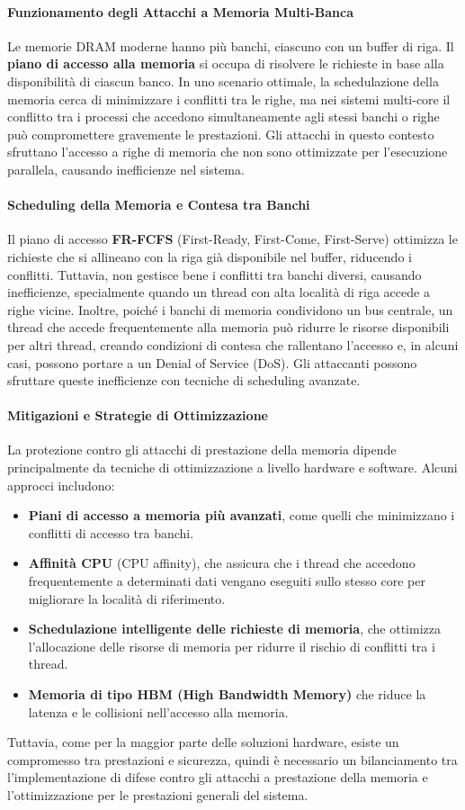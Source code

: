 \paragraph{Funzionamento degli Attacchi a Memoria Multi-Banca}
Le memorie DRAM moderne hanno più banchi, ciascuno con un buffer di riga. Il \textbf{piano di accesso alla memoria} si occupa di risolvere le richieste in base alla disponibilità di ciascun banco. In uno scenario ottimale, la schedulazione della memoria cerca di minimizzare i conflitti tra le righe, ma nei sistemi multi-core il conflitto tra i processi che accedono simultaneamente agli stessi banchi o righe può compromettere gravemente le prestazioni. Gli attacchi in questo contesto sfruttano l'accesso a righe di memoria che non sono ottimizzate per l'esecuzione parallela, causando inefficienze nel sistema.

\paragraph{Scheduling della Memoria e Contesa tra Banchi}
Il piano di accesso \textbf{FR-FCFS} (First-Ready, First-Come, First-Serve) ottimizza le richieste che si allineano con la riga già disponibile nel buffer, riducendo i conflitti. Tuttavia, non gestisce bene i conflitti tra banchi diversi, causando inefficienze, specialmente quando un thread con alta località di riga accede a righe vicine. Inoltre, poiché i banchi di memoria condividono un bus centrale, un thread che accede frequentemente alla memoria può ridurre le risorse disponibili per altri thread, creando condizioni di contesa che rallentano l'accesso e, in alcuni casi, possono portare a un Denial of Service (DoS). Gli attaccanti possono sfruttare queste inefficienze con tecniche di scheduling avanzate.

\paragraph{Mitigazioni e Strategie di Ottimizzazione}
La protezione contro gli attacchi di prestazione della memoria dipende principalmente da tecniche di ottimizzazione a livello hardware e software. Alcuni approcci includono:

\begin{itemize}
  \item \textbf{Piani di accesso a memoria più avanzati}, come quelli che minimizzano i conflitti di accesso tra banchi.
  \item \textbf{Affinità CPU} (CPU affinity), che assicura che i thread che accedono frequentemente a determinati dati vengano eseguiti sullo stesso core per migliorare la località di riferimento.
  \item \textbf{Schedulazione intelligente delle richieste di memoria}, che ottimizza l'allocazione delle risorse di memoria per ridurre il rischio di conflitti tra i thread.
  \item \textbf{Memoria di tipo HBM (High Bandwidth Memory)} che riduce la latenza e le collisioni nell'accesso alla memoria.
\end{itemize}

Tuttavia, come per la maggior parte delle soluzioni hardware, esiste un compromesso tra prestazioni e sicurezza, quindi è necessario un bilanciamento tra l'implementazione di difese contro gli attacchi a prestazione della memoria e l'ottimizzazione per le prestazioni generali del sistema.
